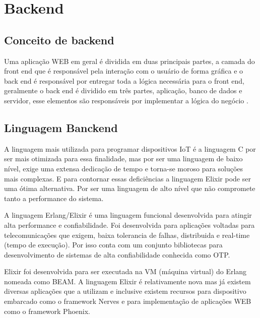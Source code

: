 \documentclass[../../layout.tex]{subfiles}
\begin{document}
\section{Backend}
\subsection{Conceito de backend}
\hspace*{3em}Uma aplicação WEB em geral é dividida  em duas principais partes, a camada do front end que é responsável pela interação com o usuário de forma gráfica e o back end é responsável por entregar toda a lógica necessária para o front end, geralmente o back end é dividido em três partes, aplicação, banco de dados  e servidor, esse elementos são responsáveis por implementar a lógica do negócio \cite{16}.

\subsection{Linguagem Banckend}
\hspace*{3em}A linguagem mais utilizada para programar dispositivos IoT é a linguagem C por ser mais otimizada para essa finalidade, mas por ser uma linguagem de baixo nível, exige uma extensa dedicação de tempo e torna-se moroso para soluções mais complexas. E para contornar essas deficiências a linguagem Elixir pode ser uma ótima alternativa. Por ser uma linguagem de alto  nível que não compromete tanto a performance do sistema.\par
A linguagem Erlang/Elixir é uma linguagem funcional desenvolvida para atingir alta performance e confiabilidade. Foi desenvolvida para aplicações voltadas para telecomunicações que exigem, baixa tolerancia de falhas, distribuida e real-time (tempo de execução). Por isso conta com um conjunto bibliotecas para desenvolvimento de sistemas de alta confiabilidade conhecida como OTP.\par
Elixir foi desenvolvida para ser executada na VM (máquina virtual) do Erlang nomeada como BEAM. A linguagem Elixir é relativamente nova mas já existem diversas aplicações que a utilizam e inclusive existem recursos para dispositivo embarcado como o framework Nerves \cite{ElixirorIoT} e para implementação de aplicações WEB como o framework Phoenix.
\end{document}
